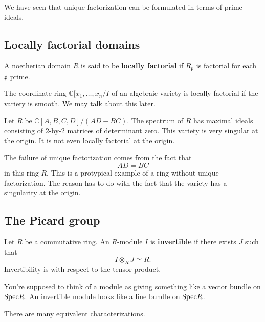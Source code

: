 We have seen that unique factorization can be formulated in terms of prime
ideals.

\subsection{Locally factorial domains}
\begin{definition} 
A noetherian domain $R$ is said to be \textbf{locally factorial} if
$R_{\mathfrak{p}}$ is factorial for each $\mathfrak{p}$ prime.
\end{definition} 

\begin{example} 
The coordinate ring $\mathbb{C}[x_1, \dots, x_n/I$ of an algebraic variety is
locally factorial if the variety is smooth. We may talk about this later. 
\end{example} 

\begin{example}[Nonexample]
Let $R$ be $\mathbb{C}[A,B,C,D]/(AD - BC)$. The spectrum of $R$ has maximal
ideals consisting of 2-by-2 matrices of determinant zero. This variety is very
singular at the origin. It is not even locally factorial at the origin.

The failure of unique factorization comes from the fact that
\[ AD = BC  \]
in this ring $R$. This is a protypical example of a ring without unique
factorization. The reason has to do with the fact that the variety has a
singularity at the origin. 
\end{example} 

\subsection{The Picard group}

\begin{definition} 
Let $R$ be a commutative ring. An $R$-module $I$ is \textbf{invertible} if
there exists $J$ such that
\[ I \otimes_R J \simeq R.  \]
Invertibility  is with respect to the tensor product.
\end{definition} 

\begin{remark} 
You're supposed to think of a module as giving something like a vector bundle
on $\mathrm{Spec} R$. An invertible module looks like a line bundle on $\mathrm{Spec} R$.
\end{remark} 

There are many equivalent characterizations.

